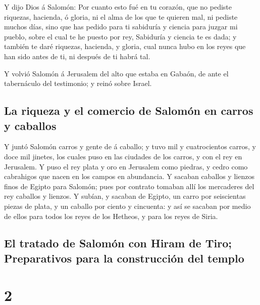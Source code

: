  Y dijo Dios á Salomón: Por cuanto esto fué en tu
corazón, que no pediste riquezas, hacienda, ó gloria, ni el alma de los
que te quieren mal, ni pediste muchos días, sino que has pedido para ti
sabiduría y ciencia para juzgar mi pueblo, sobre el cual te he puesto
por rey,  Sabiduría y ciencia te es dada; y también te
daré riquezas, hacienda, y gloria, cual nunca hubo en los reyes que han
sido antes de ti, ni después de ti habrá tal.

 Y volvió Salomón á Jerusalem del alto que estaba en
Gabaón, de ante el tabernáculo del testimonio; y reinó sobre Israel.

\hypertarget{la-riqueza-y-el-comercio-de-salomuxf3n-en-carros-y-caballos}{%
\subsection{La riqueza y el comercio de Salomón en carros y
caballos}\label{la-riqueza-y-el-comercio-de-salomuxf3n-en-carros-y-caballos}}

 Y juntó Salomón carros y gente de á caballo; y tuvo mil
y cuatrocientos carros, y doce mil jinetes, los cuales puso en las
ciudades de los carros, y con el rey en Jerusalem.  Y
puso el rey plata y oro en Jerusalem como piedras, y cedro como
cabrahigos que nacen en los campos en abundancia.  Y
sacaban caballos y lienzos finos de Egipto para Salomón; pues por
contrato tomaban allí los mercaderes del rey caballos y lienzos.
 Y subían, y sacaban de Egipto, un carro por seiscientas
piezas de plata, y un caballo por ciento y cincuenta: y así se sacaban
por medio de ellos para todos los reyes de los Hetheos, y para los reyes
de Siria.

\hypertarget{el-tratado-de-salomuxf3n-con-hiram-de-tiro-preparativos-para-la-construcciuxf3n-del-templo}{%
\subsection{El tratado de Salomón con Hiram de Tiro; Preparativos para
la construcción del
templo}\label{el-tratado-de-salomuxf3n-con-hiram-de-tiro-preparativos-para-la-construcciuxf3n-del-templo}}

\hypertarget{section-1}{%
\section{2}\label{section-1}}

